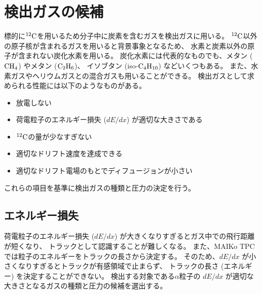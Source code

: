 \section{検出ガスの候補}
標的に${}^{12}{\rm C}$を用いるため分子中に炭素を含むガスを検出ガスに用いる。
${}^{12}{\rm C}$以外の原子核が含まれるガスを用いると背景事象となるため、
水素と炭素以外の原子が含まれない炭化水素を用いる。
炭化水素には代表的なものでも、メタン (${\rm CH_{4}}$) やメタン (${\rm C_{2}H_{6}}$)、
イソブタン (iso-${\rm C_{4}H_{10}}$) などいくつもある。
また、水素ガスやヘリウムガスとの混合ガスも用いることができる。
検出ガスとして求められる性能には以下のようなものがある。
\begin{itemize}
\item
  放電しない
\item
  荷電粒子のエネルギー損失 ($dE/dx$) が適切な大きさである
\item
  ${}^{12}{\rm C}$の量が少なすぎない
\item
  適切なドリフト速度を達成できる
\item
  適切なドリフト電場のもとでディフュージョンが小さい
\end{itemize}
これらの項目を基準に検出ガスの種類と圧力の決定を行う。

\subsection{エネルギー損失}
荷電粒子のエネルギー損失 ($dE/dx$) が大きくなりすぎるとガス中での飛行距離が短くなり、
トラックとして認識することが難しくなる。
また、MAIKo TPC では粒子のエネルギーをトラックの長さから決定する。
そのため、$dE/dx$ が小さくなりすぎるとトラックが有感領域で止まらず、
トラックの長さ (エネルギー) を決定することができない。
検出する対象である$\alpha$粒子の $dE/dx$ が適切な大きさとなるガスの種類と圧力の候補を選出する。

